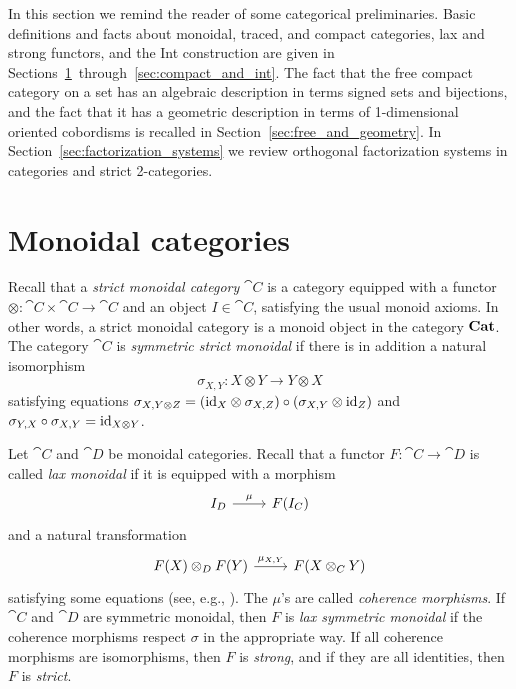 \documentclass[11pt,oneside,article]{memoir}
\begin{document}
In this section we remind the reader of some categorical preliminaries. Basic definitions and facts
about monoidal, traced, and compact categories, lax and strong functors, and the Int construction
are given in Sections~\ref{sec:prelim_monoidal}~through~\ref{sec:compact_and_int}. The fact that the
free compact category on a set has an algebraic description in terms signed sets and bijections, and
the fact that it has a geometric description in terms of 1-dimensional oriented cobordisms is
recalled in Section~\ref{sec:free_and_geometry}. In Section~\ref{sec:factorization_systems} we
review orthogonal factorization systems in categories and strict 2-categories.

\section{Monoidal categories}
      \label{sec:prelim_monoidal}

Recall that a \emph{strict monoidal category} $\cat{C}$ is a category equipped with a functor
$\otimes\colon\cat{C}\times\cat{C}\to\cat{C}$ and an object $I\in\cat{C}$, satisfying the usual
monoid axioms. In other words, a strict monoidal category is a monoid object in the category $\mathbf{Cat}$.
The category $\cat{C}$ is \emph{symmetric strict monoidal} if there is in addition a natural
isomorphism
\[
   \sigma_{X,Y}\colon X\otimes Y\to Y\otimes X
\]
satisfying equations $\sigma_{X,Y\otimes Z}=(\mathrm{id}_X\otimes\sigma_{X,Z})\circ(\sigma_{X,Y}\otimes
\mathrm{id}_Z)$ and $\sigma_{Y,X}\circ\sigma_{X,Y}=\mathrm{id}_{X\otimes Y}$.

Let $\cat{C}$ and $\cat{D}$ be monoidal categories. Recall that a functor
$F\colon\cat{C}\to\cat{D}$ is called \emph{lax monoidal} if it is equipped with a morphism
\begin{equation*} \begin{tikzcd}
      I_D \rar{\mu} & F(I_C)
\end{tikzcd} \end{equation*}
and a natural transformation
\begin{equation*} \begin{tikzcd}
      F(X) \otimes_D F(Y) \rar{\mu_{X,Y}} & F(X\otimes_C Y)
\end{tikzcd} \end{equation*}
satisfying some equations (see, e.g., \cite{Leinster,BorceuxV2}). The $\mu$'s are called
\emph{coherence morphisms}. If $\cat{C}$ and $\cat{D}$ are symmetric monoidal, then $F$ is \emph{lax
symmetric monoidal} if the coherence morphisms respect $\sigma$ in the appropriate way. If all
coherence morphisms are isomorphisms, then $F$ is \emph{strong}, and if they are all identities,
then $F$ is \emph{strict}.
\end{document}
